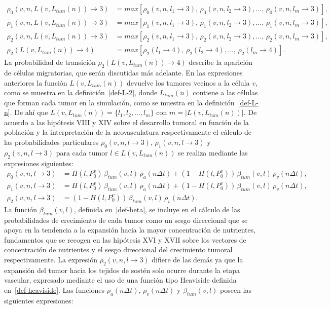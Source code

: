 \begin{align*}
\rho_0(v,n,L(v,L_{tum}(n)) \rightarrow 3) &= max\left[\rho_0(v,n,l_1 \rightarrow 3),\,\rho_0(v,n,l_2 \rightarrow 3),\ldots,\,\rho_0(v,n,l_m \rightarrow 3)\right],\\
\rho_1(v,n,L(v,L_{tum}(n)) \rightarrow 3) &= max\left[\rho_1(v,n,l_1 \rightarrow 3),\,\rho_1(v,n,l_2 \rightarrow 3),\ldots,\,\rho_1(v,n,l_m \rightarrow 3)\right],\\
\rho_2(v,n,L(v,L_{tum}(n)) \rightarrow 3) &= max\left[\rho_2(v,n,l_1 \rightarrow 3),\,\rho_2(v,n,l_2 \rightarrow 3),\ldots,\,\rho_2(v,n,l_m \rightarrow 3)\right],\\
\rho_2(L(v,L_{tum}(n)) \rightarrow 4) &= max\left[\rho_2(l_1 \rightarrow 4),\,\rho_2(l_2 \rightarrow 4),\ldots,\,\rho_2(l_m \rightarrow 4)\right].
\end{align*}
La probabilidad de transici\'on $\rho_2(L(v,L_{tum}(n)) \rightarrow 4)$ describe la aparici\'on de c\'elulas migratorias, que ser\'an discutidas m\'as adelante. En las expresiones anteriores la funci\'on $L(v,L_{tum}(n))$ devuelve los tumores vecinos a la c\'elula $v$, como se muestra en la definici\'on~\ref{def-L-2}, donde $L_{tum}(n)$ contiene a las c\'elulas que forman cada tumor en la simulaci\'on, como se muestra en la definici\'on~\ref{def-L-n}. De ah\'i que $L(v,L_{tum}(n))=\lbrace l_1, l_2, \ldots, l_m \rbrace$ con $m=|L(v,L_{tum}(n))|$. De acuerdo a las hip\'otesis VIII y XIV sobre el desarrollo tumoral en funci\'on de la poblaci\'on y la interpretaci\'on de la neovasculatura respectivamente el c\'alculo de las probabilidades particulares $\rho_0(v,n,l \rightarrow 3)$, $\rho_1(v,n,l \rightarrow 3)$ y $\rho_2(v,n,l \rightarrow 3)$ para cada tumor $l \in L(v,L_{tum}(n))$ se realiza mediante las expresiones siguientes:
\begin{align*}
\rho_0(v,n,l \rightarrow 3)& = H(l,P_0^v)\,\beta_{tum}(v,l)\,\rho_a(n\Delta t) + (1-H(l,P_0^v))\,\beta_{tum}(v,l)\,\rho_v(n\Delta t), \\
\rho_1(v,n,l \rightarrow 3)& = H(l,P_0^v)\,\beta_{tum}(v,l)\,\rho_a(n\Delta t) + (1-H(l,P_0^v))\,\beta_{tum}(v,l)\,\rho_v(n\Delta t), \\
\rho_2(v,n,l \rightarrow 3)& = (1-H(l,P_0^v))\,\beta_{tum}(v,l)\,\rho_v(n\Delta t). 
\end{align*}
La funci\'on $\beta_{tum}(v,l)$, definida en~\ref{def-beta}, se incluye en el c\'alculo de las probabilidades de crecimiento de cada tumor como un sesgo direccional que se apoya en la tendencia a la expansi\'on hacia la mayor concentraci\'on de nutrientes, fundamentos que se recogen en las hip\'otesis XVI y XVII sobre los vectores de concentraci\'on de nutrientes y el sesgo direccional del crecimiento tumoral respectivamente. La expresi\'on $\rho_2(v,n,l \rightarrow 3)$ difiere de las dem\'as ya que la expansi\'on del tumor hacia los tejidos de sost\'en solo ocurre durante la etapa vascular, expresado mediante el uso de una funci\'on tipo Heaviside definida en~\ref{def-heaviside}. Las funciones $\rho_a(n\Delta t)$, $\rho_v(n\Delta t)$ y $\beta_{tum}(v,l)$ poseen las siguientes expresiones:
